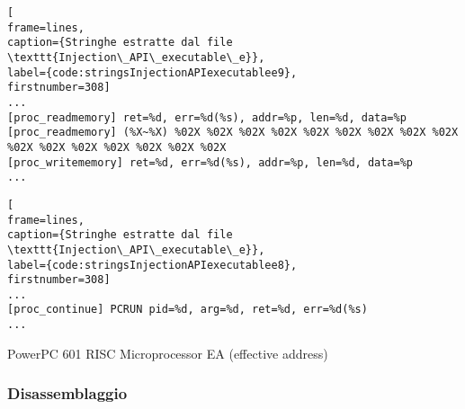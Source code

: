 \documentclass[10pt,a4paper, titlepage]{report}
\begin{document}
\begin{lstlisting}[
frame=lines, 
caption={Stringhe estratte dal file \texttt{Injection\_API\_executable\_e}}, 
label={code:stringsInjectionAPIexecutablee9},
firstnumber=308]
...
[proc_readmemory] ret=%d, err=%d(%s), addr=%p, len=%d, data=%p
[proc_readmemory] (%X~%X) %02X %02X %02X %02X %02X %02X %02X %02X %02X %02X %02X %02X %02X %02X %02X %02X
[proc_writememory] ret=%d, err=%d(%s), addr=%p, len=%d, data=%p
...
\end{lstlisting}

\begin{lstlisting}[
frame=lines, 
caption={Stringhe estratte dal file \texttt{Injection\_API\_executable\_e}}, 
label={code:stringsInjectionAPIexecutablee8},
firstnumber=308]
...
[proc_continue] PCRUN pid=%d, arg=%d, ret=%d, err=%d(%s)
...
\end{lstlisting}

PowerPC 601 RISC Microprocessor 
EA (effective address)
	
	\subsubsection{Disassemblaggio}
	
\end{document}
